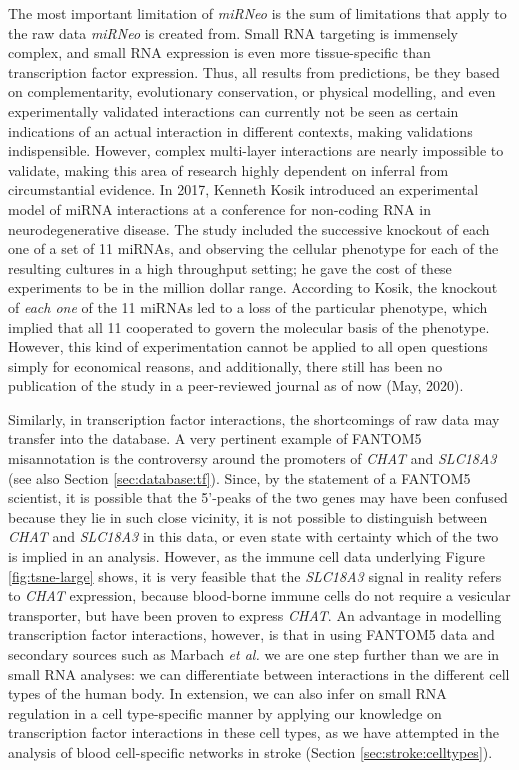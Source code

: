 The most important limitation of \emph{miRNeo} is the sum of limitations that apply to the raw data \emph{miRNeo} is created from. Small RNA targeting is immensely complex, and small RNA expression is even more tissue-specific than transcription factor expression.\cite{Nowakowski2018} Thus, all results from predictions, be they based on complementarity, evolutionary conservation, or physical modelling, and even experimentally validated interactions can currently not be seen as certain indications of an actual interaction in different contexts, making validations indispensible. However, complex multi-layer interactions are nearly impossible to validate, making this area of research highly dependent on inferral from circumstantial evidence. In 2017, Kenneth Kosik introduced an experimental model of miRNA interactions at a conference for non-coding RNA in neurodegenerative disease.\cite{Kosik2017p} The study included the successive knockout of each one of a set of 11 miRNAs, and observing the cellular phenotype for each of the resulting cultures in a high throughput setting; he gave the cost of these experiments to be in the million dollar range. According to Kosik, the knockout of \emph{each one} of the 11 miRNAs led to a loss of the particular phenotype, which implied that all 11 cooperated to govern the molecular basis of the phenotype. However, this kind of experimentation cannot be applied to all open questions simply for economical reasons, and additionally, there still has been no publication of the study in a peer-reviewed journal as of now (May, 2020).\cite{Kosik2020w}

Similarly, in transcription factor interactions, the shortcomings of raw data may transfer into the database. A very pertinent example of FANTOM5 misannotation is the controversy around the promoters of \emph{CHAT} and \emph{SLC18A3} (see also Section \ref{sec:database:tf}). Since, by the statement of a FANTOM5 scientist, it is possible that the 5'-peaks of the two genes may have been confused because they lie in such close vicinity, it is not possible to distinguish between \emph{CHAT} and \emph{SLC18A3} in this data, or even state with certainty which of the two is implied in an analysis. However, as the immune cell data underlying Figure \ref{fig:tsne-large} shows, it is very feasible that the \emph{SLC18A3} signal in reality refers to \emph{CHAT} expression, because blood-borne immune cells do not require a vesicular transporter, but have been proven to express \emph{CHAT}. An advantage in modelling transcription factor interactions, however, is that in using FANTOM5 data and secondary sources such as Marbach \emph{et al.}\cite{Marbach2016} we are one step further than we are in small RNA analyses: we can differentiate between interactions in the different cell types of the human body. In extension, we can also infer on small RNA regulation in a cell type-specific manner by applying our knowledge on transcription factor interactions in these cell types, as we have attempted in the analysis of blood cell-specific networks in stroke (Section \ref{sec:stroke:celltypes}).

